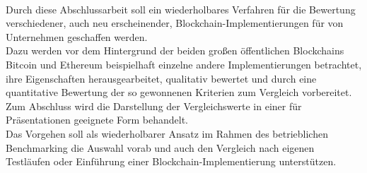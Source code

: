 
\hspace{1em}\,\vspace{3em}
\setcounter{page}{1}

Durch diese Abschlussarbeit soll ein wiederholbares Verfahren für die Bewertung verschiedener, auch neu erscheinender, Blockchain-Implementierungen für von Unternehmen geschaffen werden. \\
Dazu werden vor dem Hintergrund der beiden großen öffentlichen Blockchains Bitcoin und Ethereum beispielhaft einzelne andere Implementierungen betrachtet, ihre Eigenschaften herausgearbeitet, qualitativ bewertet und durch eine quantitative Bewertung der so gewonnenen Kriterien zum Vergleich vorbereitet. Zum Abschluss wird die Darstellung der Vergleichswerte in einer für Präsentationen geeignete Form behandelt. \\
Das Vorgehen soll als wiederholbarer Ansatz im Rahmen des betrieblichen Benchmarking die Auswahl vorab und auch den Vergleich nach eigenen Testläufen oder Einführung einer Blockchain-Implementierung unterstützen.

